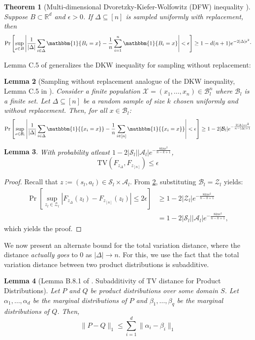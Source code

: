 \documentclass{article}
\theoremstyle{plain}
\newtheorem{theorem}{Theorem}[section]
\newtheorem{lemma}[theorem]{Lemma}
\theoremstyle{definition}
\begin{document}
\begin{theorem}[Multi-dimensional Dvoretzky-Kiefer-Wolfowitz (DFW) inequality \citep{10.1214/aoms/1177728174,NAAMAN2021109088}] Suppose $B \subset \mathbb{R}^d$ and $\epsilon>0$. If $\Delta\subseteq[n]$ is sampled uniformly with replacement, then
\[\Pr\left[\sup_{x\in B}\left|\frac{1}{|\Delta|}\sum_{i\in\Delta}\mathbbm{1}\{B_i = x\} - \frac{1}{n}\sum_{i=1}^n \mathbbm{1}\{B_i = x\}\right| < \epsilon\right] \geq 1 - d(n+1)e^{-2|\Delta|\epsilon^2}\cdot\]
\end{theorem}

Lemma C.5 of \cite{anand2024efficient} generalizes the DKW inequality for sampling without replacement:

\begin{lemma}[Sampling without replacement analogue of the DKW inequality, Lemma C.5 in \cite{anand2024efficient}]\label{theorem: sampling without replacement analog of DKW}
Consider a finite population $\mathcal{X}=(x_1,\dots,x_n)\in \mathcal{B}_l^n$ where $\mathcal{B}_l$ is a finite set. Let $\Delta\subseteq[n]$ be a random sample of size $k$ chosen uniformly and without replacement. Then, for all $x\in\mathcal{B}_l$:
\[\Pr\left[\sup_{x\in\mathcal{B}_l}\left|\frac{1}{|\Delta|}\sum_{i\in\Delta}\mathbbm{1}{\{x_i = x\}} - \frac{1}{n}\sum_{i\in[n]}\mathbbm{1}{\{x_i = x\}}\right|<\epsilon\right] \geq 1 - 2|\mathcal{B}_l|e^{-\frac{2|\Delta|n\epsilon^2}{n-|\Delta|+1}}\]
\end{lemma}


\begin{lemma}\label{full_tv_bound} With probability atleast $1-2|\mathcal{S}_l||\mathcal{A}_l|e^{-\frac{8kn\epsilon^2}{n-k+1}}$, \[\mathrm{TV}(F_{z_\Delta}, F_{z_{[n]}}) \leq \epsilon\]
\end{lemma}
\begin{proof}
    Recall that $z:=(s_l,a_l)\in\mathcal{S}_l\times\mathcal{A}_l$. From \cref{theorem: sampling without replacement analog of DKW}, substituting $\mathcal{B}_l=\mathcal{Z}_l$ yields:
 \begin{align*}\Pr\left[\sup_{z_l\in\mathcal{Z}_l}\left|F_{z_\Delta}(z_l) - F_{z_{[n]}}(z_l)\right| \leq 2\epsilon\right] &\geq 1 - 2|\mathcal{Z}_l|e^{-\frac{8kn\epsilon^2}{n-k+1}} \\
 &= 1 - 2|\mathcal{S}_l||\mathcal{A}_l|e^{-\frac{8kn\epsilon^2}{n-k+1}},\end{align*}
which yields the proof.\qedhere 
\end{proof}

We now present an alternate bound for the total variation distance, where the distance \emph{actually goes} to $0$ as $|\Delta|\to n$. For this, we use the fact that the total variation distance between two product distributions is subadditive.
\begin{lemma}[Lemma B.8.1 of \cite{Ghosal_van_der_Vaart_2017}. Subadditivity of TV distance for Product Distributions] \label{lemma: ghosal_van_der_vaart} Let $P$ and $Q$ be product distributions over some domain $S$. Let $\alpha_1,\dots,\alpha_d$ be the marginal distributions of $P$ and $\beta_1,\dots,\beta_q$ be the marginal distributions of $Q$. Then, 
\[\|P-Q\|_1 \leq \sum_{i=1}^d \|\alpha_i - \beta_i\|_1\]
\end{lemma}
\end{document}
